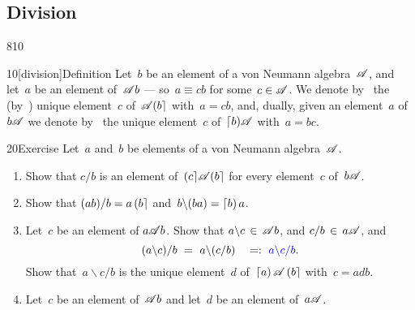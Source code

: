 \subsection{Division}
\begin{parsec}{810}%
\begin{point}{10}[division]{Definition}%
Let~$b$ be an element of a von Neumann algebra~$\mathscr{A}$,
and let~$a$ be an element of~$\mathscr{A} b$
--- so~$a\equiv cb$ for some~$c\in\mathscr{A}$.
We denote by~%
the (by~) unique
element~$c$ of~$\mathscr{A}\!\left(b\right\rceil$
with~$a=cb$,
and, dually,
given an element~$a$ of~$b\mathscr{A}$ 
we denote by~ 
the unique
element~$c$ of~$\left\lceil b\right)\!\mathscr{A}$
with~$a=bc$.
\end{point}
\begin{point}{20}{Exercise}%
Let~$a$ and~$b$
be elements of a von Neumann algebra~$\mathscr{A}$.
\begin{enumerate}
\item
Show that $c/b$ is an element of~$\left(c\right\rceil\!\mathscr{A}\!\left(b\right\rceil$
for every element~$c$ of~$b\mathscr{A}$.
\item
Show that $(ab)/b = a\left(b\right\rceil$
and~$b\backslash (ba)=\left\lceil b\right)a$.
\item
Let~$c$ be an element of $a\mathscr{A} b$.
Show that
$a \backslash c \,\in\, \mathscr{A} b$,
and
$c/b\,\in\,a\mathscr{A}$, and
\begin{equation*}
(a\backslash c)/b\ =\  a\backslash(c/b)
\quad =:\  \Define{a\backslash c/b}.
\end{equation*}
Show that~$a\backslash c/b$
is the unique element~$d$ of~$\left\lceil a\right)\mathscr{A}\left(b\right\rceil$
with~$c=adb$. 
\item
Let~$c$ be an element of~$\mathscr{A} b$
and let~$d$ be an element of~$a\mathscr{A}$.


\end{enumerate}
\end{point}
\end{parsec}
